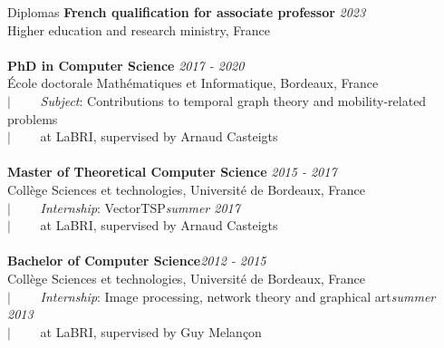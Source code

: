 \documentclass[french]{resume} %
\begin{document}
	\begin{rSection}{Diplomas}
		{\bf French qualification for associate professor} \hfill {\em 2023}
		\\ Higher education and research ministry, France 
		\\ \\
		{\bf PhD in Computer Science} \hfill {\em 2017 - 2020} 
		\\ École doctorale Mathématiques et Informatique, Bordeaux, France
		\\ $| \qquad$ \textit{Subject}: Contributions to temporal graph theory and mobility-related problems
		\\ $| \qquad$ at LaBRI, supervised by Arnaud Casteigts
		\\ \\
		{\bf Master of Theoretical Computer Science} \hfill {\em 2015 -  2017} 
		\\ Collège Sciences et technologies, Université de Bordeaux, France 
		\\ $| \qquad$ \textit{Internship}: VectorTSP\hfill {\em summer 2017} 
		\\ $| \qquad $ at LaBRI, supervised by Arnaud Casteigts
		\\ \\ 
		\textbf{Bachelor of Computer Science}\hfill {\em 2012 -  2015} 
		\\ Collège Sciences et technologies, Université de Bordeaux, France 
		\\ $| \qquad$ \textit{Internship}: Image processing, network theory and graphical art\hfill {\em summer 2013} 
		\\ $|  \qquad $ at LaBRI, supervised by Guy Melançon
	\end{rSection}
	\newpage
\end{document}
